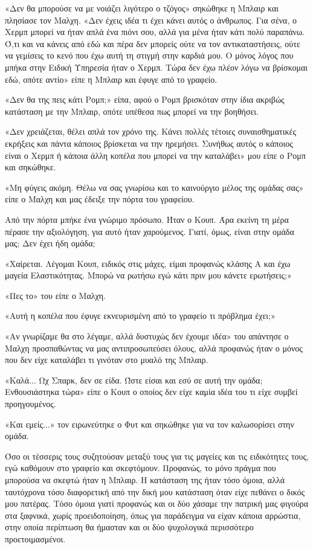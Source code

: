 \documentclass[12pt,twoside, openany]{book}
\begin{document}
«Δεν θα μπορούσε να με νοιάζει λιγότερο ο τζόγος» σηκώθηκε η Μπλαιρ και πλησίασε τον Μαλχη. «Δεν έχεις ιδέα τι έχει κάνει αυτός ο άνθρωπος. Για σένα, ο Χερμπ μπορεί να ήταν απλά ένα πιόνι σου, αλλά για μένα ήταν κάτι πολύ παραπάνω. Ό,τι και να κάνεις από εδώ και πέρα δεν μπορείς ούτε να τον αντικαταστήσεις, ούτε να γεμίσεις το κενό που έχω αυτή τη στιγμή στην καρδιά μου. Ο μόνος λόγος που μπήκα στην Ειδική Υπηρεσία ήταν ο Χερμπ. Τώρα δεν έχω πλέον λόγω να βρίσκομαι εδώ, οπότε αντίο» είπε η Μπλαιρ και έφυγε από το γραφείο.

«Δεν θα της πεις κάτι Ρομπ;» είπα, αφού ο Ρομπ βρισκόταν στην ίδια ακριβώς κατάσταση με την Μπλαιρ, οπότε υπέθεσα πως μπορεί να την βοηθήσει.

«Δεν χρειάζεται, θέλει απλά τον χρόνο της. Κάνει πολλές τέτοιες συναισθηματικές εκρήξεις και πάντα κάποιος βρίσκεται να την ηρεμήσει. Συνήθως αυτός ο κάποιος είναι ο Χερμπ ή κάποια άλλη κοπέλα που μπορεί να την καταλάβει» μου είπε ο Ρομπ και σηκώθηκε.

«Μη φύγεις ακόμη. Θέλω να σας γνωρίσω και το καινούργιο μέλος της ομάδας σας» είπε ο Μαλχη και μας έδειξε την πόρτα του γραφείου. 

Από την πόρτα μπήκε ένα γνώριμο πρόσωπο. Ήταν ο Κουπ. Άρα εκείνη τη μέρα πέρασε την αξιολόγηση, για αυτό ήταν χαρούμενος. Γιατί, όμως, είναι στην ομάδα μας; Δεν έχει ήδη ομάδα;

«Χαίρεται. Λέγομαι Κουπ, ειδικός στις μάχες, είμαι προφανώς κλάσης Α και έχω μαγεία Ελαστικότητας. Μπορώ να ρωτήσω εγώ κάτι πριν μου κάνετε ερωτήσεις;»

«Πες το» του είπε ο Μαλχη.

«Αυτή η κοπέλα που έφυγε εκνευρισμένη από το γραφείο τι πρόβλημα έχει;»

«Αν γνωρίζαμε θα στο λέγαμε, αλλά δυστυχώς δεν έχουμε ιδέα» του απάντησε ο Μαλχη προσπαθώντας να μας αντιπροσωπεύσει όλους, αλλά προφανώς ήταν ο μόνος που δεν είχε καταλάβει τι γινόταν στο μυαλό της Μπλαιρ.

«Καλά... Ωχ Σπαρκ, δεν σε είδα. Ώστε είσαι και εσύ σε αυτή την ομάδα; Ενθουσιάστηκα τώρα» είπε ο Κουπ ο οποίος δεν είχε καμία ιδέα του τι είχε συμβεί προηγουμένος.

«Και εμείς...» τον ειρωνεύτηκε ο Φυτ και σηκώθηκε για να τον καλωσορίσει στην ομάδα.

Όσο οι τέσσερις τους συζητούσαν μεταξύ τους για τις μαγείες και τις ειδικότητες τους, εγώ καθόμουν στο γραφείο και σκεφτόμουν. Προφανώς, το μόνο πράγμα που μπορούσα να σκεφτώ ήταν η Μπλαιρ. Η κατάσταση της ήταν τόσο όμοια, αλλά ταυτόχρονα τόσο διαφορετική από την δική μου κατάσταση όταν είχε πεθάνει ο δικός μου πατέρας. Τόσο όμοια γιατί προφανώς και οι δύο χάσαμε την πατρική μας φιγούρα στα ξαφνικά, χωρίς προειδοποίηση, όπως για παράδειγμα να είχαν κάποια αρρώστια, στην οποία περίπτωση θα ήμασταν και οι δύο ψυχολογικά περισσότερο προετοιμασμένοι.
\end{document}
